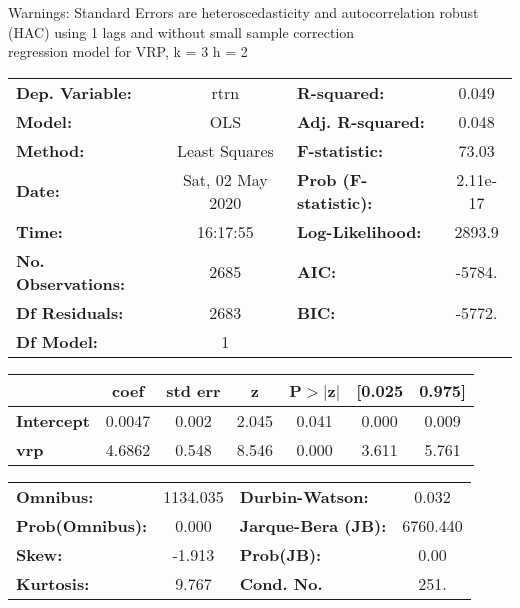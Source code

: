 Warnings: \newline
 [1] Standard Errors are heteroscedasticity and autocorrelation robust (HAC) using 1 lags and without small sample correction\\ 

regression model for VRP, k = 3 h = 2\begin{center}
\begin{tabular}{lclc}
\toprule
\textbf{Dep. Variable:}    &       rtrn       & \textbf{  R-squared:         } &     0.049   \\
\textbf{Model:}            &       OLS        & \textbf{  Adj. R-squared:    } &     0.048   \\
\textbf{Method:}           &  Least Squares   & \textbf{  F-statistic:       } &     73.03   \\
\textbf{Date:}             & Sat, 02 May 2020 & \textbf{  Prob (F-statistic):} &  2.11e-17   \\
\textbf{Time:}             &     16:17:55     & \textbf{  Log-Likelihood:    } &    2893.9   \\
\textbf{No. Observations:} &        2685      & \textbf{  AIC:               } &    -5784.   \\
\textbf{Df Residuals:}     &        2683      & \textbf{  BIC:               } &    -5772.   \\
\textbf{Df Model:}         &           1      & \textbf{                     } &             \\
\bottomrule
\end{tabular}
\begin{tabular}{lcccccc}
                   & \textbf{coef} & \textbf{std err} & \textbf{z} & \textbf{P$> |$z$|$} & \textbf{[0.025} & \textbf{0.975]}  \\
\midrule
\textbf{Intercept} &       0.0047  &        0.002     &     2.045  &         0.041        &        0.000    &        0.009     \\
\textbf{vrp}       &       4.6862  &        0.548     &     8.546  &         0.000        &        3.611    &        5.761     \\
\bottomrule
\end{tabular}
\begin{tabular}{lclc}
\textbf{Omnibus:}       & 1134.035 & \textbf{  Durbin-Watson:     } &    0.032  \\
\textbf{Prob(Omnibus):} &   0.000  & \textbf{  Jarque-Bera (JB):  } & 6760.440  \\
\textbf{Skew:}          &  -1.913  & \textbf{  Prob(JB):          } &     0.00  \\
\textbf{Kurtosis:}      &   9.767  & \textbf{  Cond. No.          } &     251.  \\
\bottomrule
\end{tabular}
\end{center}

